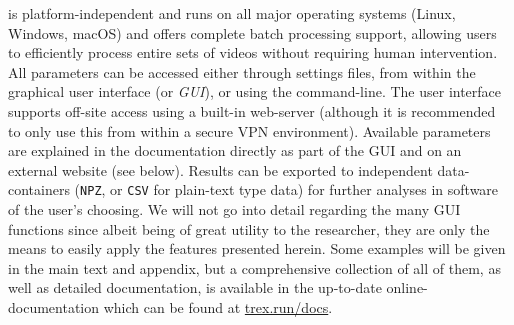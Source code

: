 \documentclass[9pt,lineno]{elife}
\newcommand{\TRex}{\protect\path{TRex}}
\begin{document}
\TRex{} is platform-independent and runs on all major operating systems (Linux, Windows, macOS) and offers complete batch processing support, allowing users to efficiently process entire sets of videos without requiring human intervention. All parameters can be accessed either through settings files, from within the graphical user interface (or \textit{GUI}), or using the command-line. The user interface supports off-site access using a built-in web-server (although it is recommended to only use this from within a secure VPN environment). Available parameters are explained in the documentation directly as part of the GUI and on an external website (see below). Results can be exported to independent data-containers (\texttt{NPZ}, or \texttt{CSV} {\color{blue} for plain-text type data}) for further analyses in software of the user's choosing. We will not go into detail regarding the many GUI functions since albeit being of great utility to the researcher, they are only the means to easily apply the features presented herein. Some examples will be given in the main text and appendix, but a comprehensive collection of all of them, as well as detailed documentation, is available in the up-to-date online-documentation which can be found at \href{https://trex.run/docs}{trex.run/docs}.

\end{document}
